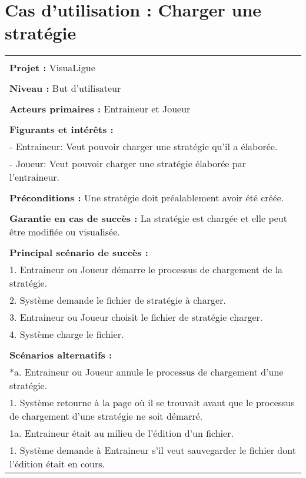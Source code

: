 \section{Cas d'utilisation : Charger une stratégie}
\begin{longtable}{|p{16cm}|}
	\hline
	\\
	\textbf{Projet :} VisuaLigue\\
	\\
	\textbf{Niveau :} But d'utilisateur\\
	\\
	\textbf{Acteurs primaires :} Entraineur et Joueur\\
	\\
	\textbf{Figurants et intérêts :} \\
	- Entraineur: Veut pouvoir charger une stratégie qu'il a élaborée.\\
	- Joueur: Veut pouvoir charger une stratégie élaborée par l'entraineur.\\
	\\
	\textbf{Préconditions :} Une stratégie doit préalablement avoir été créée.\\
	\\
	\textbf{Garantie en cas de succès :} La stratégie est chargée et elle peut être modifiée ou visualisée.\\
	\\
	\textbf{Principal scénario de succès :}\\
	1. Entraineur ou Joueur démarre le processus de chargement de la stratégie.\\
	2. Système demande le fichier de stratégie à charger.\\
	3. Entraineur ou Joueur choisit le fichier de stratégie charger.\\
	4. Système charge le fichier.\\
	\\
	\textbf{Scénarios alternatifs :}\\
	*a. Entraineur ou Joueur annule le processus de chargement d'une stratégie.\\
	\hspace{1cm}1. Système retourne à la page où il se trouvait avant que le processus de chargement d'une stratégie ne soit démarré.\\
	1a. Entraineur était au milieu de l'édition d'un fichier.\\
	\hspace{1cm}1. Système demande à Entraineur s'il veut sauvegarder le fichier dont l'édition était en cours.\\

\end{longtable}
